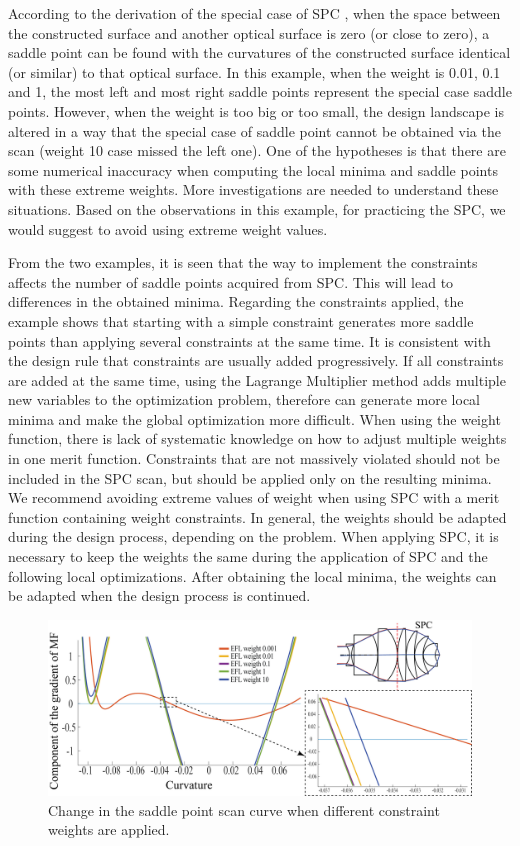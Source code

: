 According to the derivation of the special case of SPC \cite{BociortSPCSexplained}, when the space between the constructed surface and another optical surface is zero (or close to zero), a saddle point can be found with the curvatures of the constructed surface identical (or similar) to that optical surface. In this example, when the weight is 0.01, 0.1 and 1, the most left and most right saddle points represent the special case saddle points. However, when the weight is too big or too small, the design landscape is altered in a way that the special case of saddle point cannot be obtained via the scan (weight 10 case missed the left one). One of the hypotheses is that there are some numerical inaccuracy when computing the local minima and saddle points with these extreme weights. More investigations are needed to understand these situations. Based on the observations in this example, for practicing the SPC, we would suggest to avoid using extreme weight values. 

From the two examples, it is seen that the way to implement the constraints affects the number of saddle points acquired from SPC. This will lead to differences in the obtained minima. Regarding the constraints applied, the example shows that starting with a simple constraint generates more saddle points than applying several constraints at the same time. It is consistent with the design rule that constraints are usually added progressively. If all constraints are added at the same time, using the Lagrange Multiplier method adds multiple new variables to the optimization problem, therefore can generate more local minima and make the global optimization more difficult. When using the weight function, there is lack of systematic knowledge on how to adjust multiple weights in one merit function. Constraints that are not massively violated should not be included in the SPC scan, but should be applied only on the resulting minima. We recommend avoiding extreme values of weight when using SPC with a merit function containing weight constraints. In general, the weights should be adapted during the design process, depending on the problem. When applying SPC, it is necessary to keep the weights the same during the application of SPC and the following local optimizations. After obtaining the local minima, the weights can be adapted when the design process is continued. 

\begin{figure}[h!]
    \centering
    \includegraphics[width=\textwidth]{chapter-4/figures/Vollrath_wt_change.png}
    \caption{Change in the saddle point scan curve when different constraint weights are applied.}
    \label{fig: vollrath_wt_change}
\end{figure}

